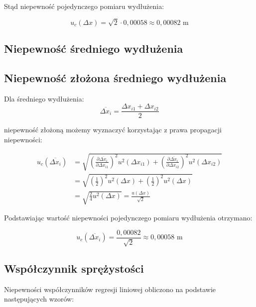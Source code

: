 \documentclass[a4paper,12pt]{article}
\begin{document}
Stąd niepewność pojedynczego pomiaru wydłużenia:

\begin{equation*}
    u_c(\Delta x) = \sqrt{2} \cdot 0,00058 \approx 0,00082 \text{ m}
\end{equation*}

\subsection{Niepewność średniego wydłużenia}

\subsection*{Niepewność złożona średniego wydłużenia}

Dla średniego wydłużenia:
\begin{equation*}
    \overline{\Delta x_i} = \frac{\Delta x_{i1} + \Delta x_{i2}}{2}
\end{equation*}

niepewność złożoną możemy wyznaczyć korzystając z prawa propagacji niepewności:

\begin{align*}
    u_c(\overline{\Delta x_i}) & = \sqrt{\left(\frac{\partial \overline{\Delta x_i}}{\partial \Delta x_{i1}}\right)^2 u^2(\Delta x_{i1}) + \left(\frac{\partial \overline{\Delta x_i}}{\partial \Delta x_{i2}}\right)^2 u^2(\Delta x_{i2})} \\
                               & = \sqrt{\left(\frac{1}{2}\right)^2 u^2(\Delta x) + \left(\frac{1}{2}\right)^2 u^2(\Delta x)}                                                                                                               \\
                               & = \sqrt{\frac{2}{4} u^2(\Delta x)} = \frac{u(\Delta x)}{\sqrt{2}}
\end{align*}

Podstawiając wartość niepewności pojedynczego pomiaru wydłużenia otrzymano:

\begin{equation*}
    u_c(\overline{\Delta x_i}) = \frac{0,00082}{\sqrt{2}} \approx 0,00058 \text{ m}
\end{equation*}


\subsection{Współczynnik sprężystości}

Niepewności współczynników regresji liniowej obliczono na podstawie następujących wzorów:
\end{document}
